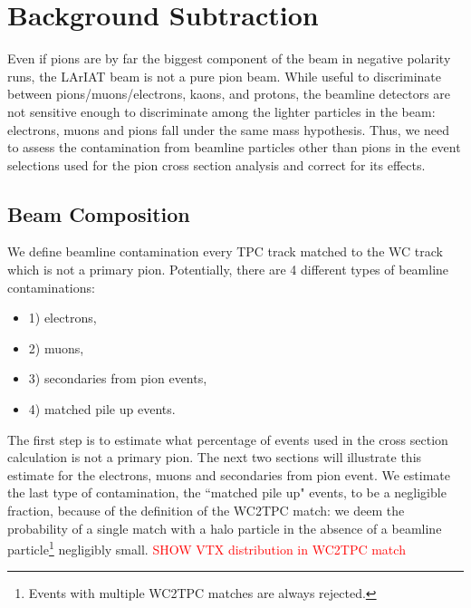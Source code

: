 \section{Background Subtraction }\label{sec:beamCont}
Even if pions are by far the biggest component of the beam in negative polarity runs, the LArIAT beam is not a pure pion beam. While useful to discriminate between pions/muons/electrons, kaons, and protons, the beamline detectors are not sensitive enough to  discriminate among the lighter particles in the beam: electrons, muons and pions fall under the same mass hypothesis. Thus, we need to assess the contamination from beamline particles other than pions in the event selections used for the pion cross section analysis and correct for its effects.

\subsection{Beam Composition}\label{sec:BeamAtWC4}
We define beamline contamination every TPC track matched to the WC track which is not a primary pion. Potentially, there are 4 different types of beamline contaminations:
\begin{itemize}
\item[]1) electrons,
\item[]2) muons,
\item[]3) secondaries from pion events,
\item[]4) matched pile up events.
\end{itemize}

The first step is to estimate what percentage of events used in the cross section calculation is not a primary pion.  The next two sections will illustrate this estimate for the electrons, muons and secondaries from pion event.
We estimate the last type of contamination, the ``matched pile up" events, to be a negligible fraction, because of the definition of the WC2TPC match: we deem the probability of a single match with a halo particle in the absence of a beamline particle\footnote{ Events with multiple WC2TPC matches are always rejected.} negligibly small. \textcolor{red}{SHOW VTX distribution in WC2TPC match}


